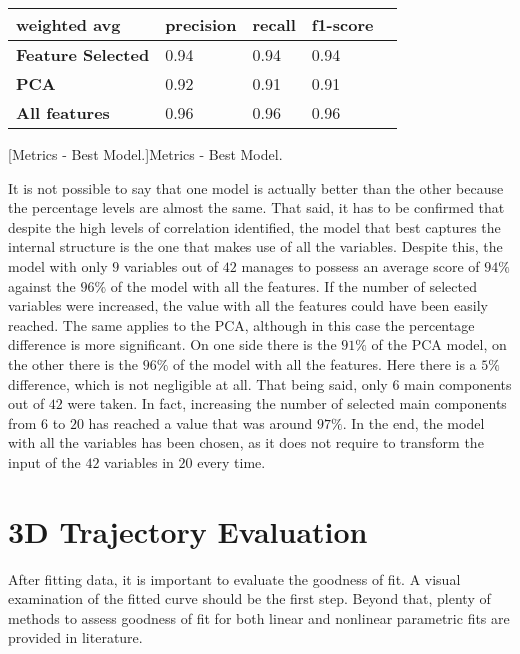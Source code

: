\begin{table}[h]
    \centering
    \begin{tabular}{|lllll|}
        \hline
        \multicolumn{1}{|l|}{\textbf{weighted avg}}             & \multicolumn{1}{l|}{\textbf{precision}} & \multicolumn{1}{l|}{\textbf{recall}} & \multicolumn{1}{l|}{\textbf{f1-score}}\\ 
        \hline
        \multicolumn{1}{|l|}{\textbf{Feature Selected}}     & \multicolumn{1}{l|}{0.94}               & \multicolumn{1}{l|}{0.94}            & \multicolumn{1}{l|}{0.94}\\
        \hline
        \multicolumn{1}{|l|}{\textbf{PCA}}     & \multicolumn{1}{l|}{0.92}               & \multicolumn{1}{l|}{0.91}            & \multicolumn{1}{l|}{0.91}\\
        \hline
        \multicolumn{1}{|l|}{\textbf{All features}}     & \multicolumn{1}{l|}{0.96}               & \multicolumn{1}{l|}{0.96}            & \multicolumn{1}{l|}{0.96}\\
        \hline
    \end{tabular}
	[Metrics - Best Model.]{Metrics - Best Model.}
    \label{tab:bestmod}
\end{table}

\noindent It is not possible to say that one model is actually better than the other because the percentage levels are almost the same. That said, it has to be confirmed that despite the high levels of correlation identified, the model that best captures the internal structure is the one that makes use of all the variables. Despite this, the model with only $9$ variables out of $42$ manages to possess an average score of $94\%$ against the $96\%$ of the model with all the features. If the number of selected variables were increased, the value with all the features could have been easily reached. The same applies to the PCA, although in this case the percentage difference is more significant. On one side there is the $91\%$ of the PCA model, on the other there is the $96\%$ of the model with all the features. Here there is a $5\%$ difference, which is not negligible at all. That being said, only $6$ main components out of $42$ were taken. In fact, increasing the number of selected main components from $6$ to $20$ has reached a value that was around $97\%$. In the end, the model with all the variables has been chosen, as it does not require to transform the input of the $42$ variables in $20$ every time.

\section{3D Trajectory Evaluation}
\label{sec:3dtrajeval}
After fitting data, it is important to evaluate the goodness of fit. A visual examination of the fitted curve should be the first step. Beyond that, plenty of methods to assess goodness of fit for both linear and nonlinear parametric fits are provided in literature.

